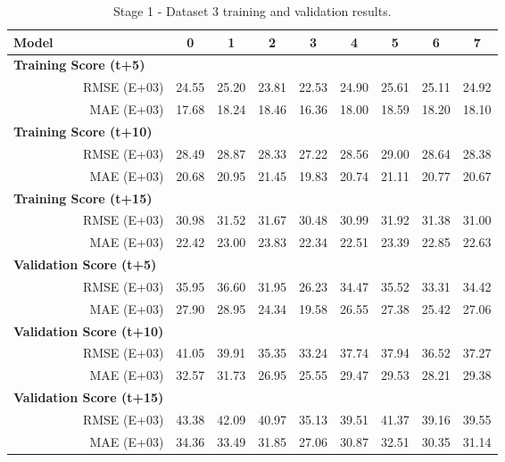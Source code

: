 \begin{table}[htbp]
  \centering
  \caption{Stage 1 - Dataset 3 training and validation results.}
    \begin{tabular}{cr|cccccccc}
    \toprule
    \multicolumn{1}{l}{\textbf{Model}} &       & 0     & 1     & 2     & 3     & 4     & 5     & 6     & 7 \\
    \midrule
    \multicolumn{2}{l|}{\textbf{Training Score (t+5)}} &       &       &       &       &       &       &       &  \\
          & RMSE (E+03) & 24.55 & 25.20 & 23.81 & 22.53 & 24.90 & 25.61 & 25.11 & 24.92 \\
          & MAE (E+03) & 17.68 & 18.24 & 18.46 & 16.36 & 18.00 & 18.59 & 18.20 & 18.10 \\
    \multicolumn{2}{l|}{\textbf{Training Score (t+10)}} &       &       &       &       &       &       &       &  \\
          & RMSE (E+03) & 28.49 & 28.87 & 28.33 & 27.22 & 28.56 & 29.00 & 28.64 & 28.38 \\
          & MAE (E+03) & 20.68 & 20.95 & 21.45 & 19.83 & 20.74 & 21.11 & 20.77 & 20.67 \\
    \multicolumn{2}{l|}{\textbf{Training Score (t+15)}} &       &       &       &       &       &       &       &  \\
          & RMSE (E+03) & 30.98 & 31.52 & 31.67 & 30.48 & 30.99 & 31.92 & 31.38 & 31.00 \\
          & MAE (E+03) & 22.42 & 23.00 & 23.83 & 22.34 & 22.51 & 23.39 & 22.85 & 22.63 \\
    \midrule
    \multicolumn{2}{l|}{\textbf{Validation Score (t+5)}} &       &       &       &       &       &       &       &  \\
          & RMSE (E+03) & 35.95 & 36.60 & 31.95 & 26.23 & 34.47 & 35.52 & 33.31 & 34.42 \\
          & MAE (E+03) & 27.90 & 28.95 & 24.34 & 19.58 & 26.55 & 27.38 & 25.42 & 27.06 \\
    \multicolumn{2}{l|}{\textbf{Validation Score (t+10)}} &       &       &       &       &       &       &       &  \\
          & RMSE (E+03) & 41.05 & 39.91 & 35.35 & 33.24 & 37.74 & 37.94 & 36.52 & 37.27 \\
          & MAE (E+03) & 32.57 & 31.73 & 26.95 & 25.55 & 29.47 & 29.53 & 28.21 & 29.38 \\
    \multicolumn{2}{l|}{\textbf{Validation Score (t+15)}} &       &       &       &       &       &       &       &  \\
          & RMSE (E+03) & 43.38 & 42.09 & 40.97 & 35.13 & 39.51 & 41.37 & 39.16 & 39.55 \\
          & MAE (E+03) & 34.36 & 33.49 & 31.85 & 27.06 & 30.87 & 32.51 & 30.35 & 31.14 \\
    \end{tabular}%
  \label{table6}%
\end{table}%